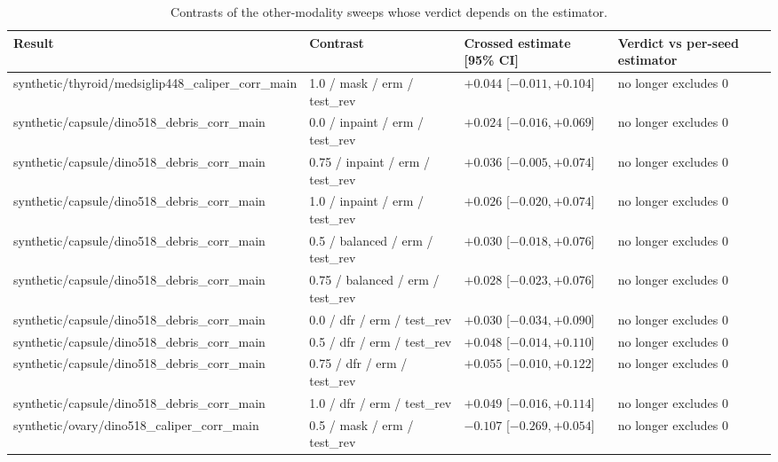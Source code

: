 \begin{table}[H]\centering\scriptsize
\caption{Contrasts of the other-modality sweeps whose verdict depends on the estimator.}\label{tab:estchanges}
\begin{tabular}{p{4.2cm}p{5.2cm}p{3.3cm}p{2.6cm}}\toprule
Result & Contrast & Crossed estimate [95\% CI] & Verdict vs per-seed estimator \\\midrule
synthetic/\allowbreak{}thyroid/\allowbreak{}medsiglip448\_caliper\_corr\_main & 1.0 /\allowbreak{} mask /\allowbreak{} erm /\allowbreak{} test\_rev & $+0.044$ [$-0.011, +0.104$] & no longer excludes 0 \\
synthetic/\allowbreak{}capsule/\allowbreak{}dino518\_debris\_corr\_main & 0.0 /\allowbreak{} inpaint /\allowbreak{} erm /\allowbreak{} test\_rev & $+0.024$ [$-0.016, +0.069$] & no longer excludes 0 \\
synthetic/\allowbreak{}capsule/\allowbreak{}dino518\_debris\_corr\_main & 0.75 /\allowbreak{} inpaint /\allowbreak{} erm /\allowbreak{} test\_rev & $+0.036$ [$-0.005, +0.074$] & no longer excludes 0 \\
synthetic/\allowbreak{}capsule/\allowbreak{}dino518\_debris\_corr\_main & 1.0 /\allowbreak{} inpaint /\allowbreak{} erm /\allowbreak{} test\_rev & $+0.026$ [$-0.020, +0.074$] & no longer excludes 0 \\
synthetic/\allowbreak{}capsule/\allowbreak{}dino518\_debris\_corr\_main & 0.5 /\allowbreak{} balanced /\allowbreak{} erm /\allowbreak{} test\_rev & $+0.030$ [$-0.018, +0.076$] & no longer excludes 0 \\
synthetic/\allowbreak{}capsule/\allowbreak{}dino518\_debris\_corr\_main & 0.75 /\allowbreak{} balanced /\allowbreak{} erm /\allowbreak{} test\_rev & $+0.028$ [$-0.023, +0.076$] & no longer excludes 0 \\
synthetic/\allowbreak{}capsule/\allowbreak{}dino518\_debris\_corr\_main & 0.0 /\allowbreak{} dfr /\allowbreak{} erm /\allowbreak{} test\_rev & $+0.030$ [$-0.034, +0.090$] & no longer excludes 0 \\
synthetic/\allowbreak{}capsule/\allowbreak{}dino518\_debris\_corr\_main & 0.5 /\allowbreak{} dfr /\allowbreak{} erm /\allowbreak{} test\_rev & $+0.048$ [$-0.014, +0.110$] & no longer excludes 0 \\
synthetic/\allowbreak{}capsule/\allowbreak{}dino518\_debris\_corr\_main & 0.75 /\allowbreak{} dfr /\allowbreak{} erm /\allowbreak{} test\_rev & $+0.055$ [$-0.010, +0.122$] & no longer excludes 0 \\
synthetic/\allowbreak{}capsule/\allowbreak{}dino518\_debris\_corr\_main & 1.0 /\allowbreak{} dfr /\allowbreak{} erm /\allowbreak{} test\_rev & $+0.049$ [$-0.016, +0.114$] & no longer excludes 0 \\
synthetic/\allowbreak{}ovary/\allowbreak{}dino518\_caliper\_corr\_main & 0.5 /\allowbreak{} mask /\allowbreak{} erm /\allowbreak{} test\_rev & $-0.107$ [$-0.269, +0.054$] & no longer excludes 0 \\
\bottomrule\end{tabular}
\end{table}
